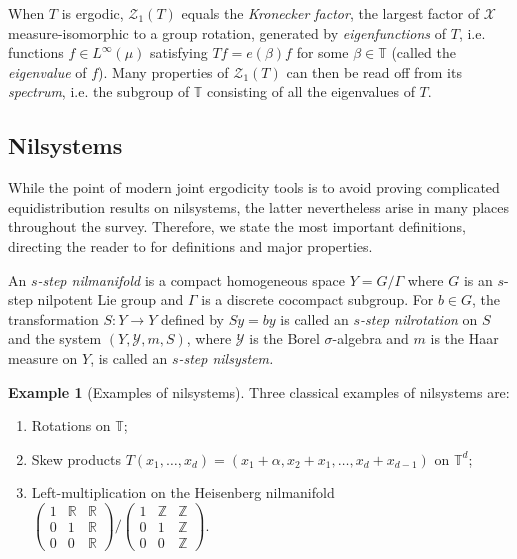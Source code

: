 \documentclass[11pt]{amsart}
\theoremstyle{definition}
\newtheorem{example}[lemma]{Example}
\newcommand{\R}{{\mathbb R}}
\newcommand{\T}{{\mathbb T}}
\newcommand{\Z}{{\mathbb Z}}
\newcommand{\CX}{{\mathcal X}}
\newcommand{\CY}{{\mathcal Y}}
\newcommand{\CZ}{{\mathcal Z}}
\newcommand{\1}{{\mathbf{1}}}
\DeclareMathOperator{\Spec}{Spec}
\newcommand{\rem}[1]{\left \{ #1 \right \}}
\begin{document}
When $T$ is ergodic, $\CZ_1(T)$ equals the \emph{Kronecker factor}, the largest factor of $\CX$ measure-isomorphic to a group rotation, generated by \emph{eigenfunctions} of $T$, i.e. functions $f\in L^\infty(\mu)$ satisfying $Tf = e(\beta) f$ for some $\beta\in\T$ (called the \emph{eigenvalue} of $f$). 
Many properties of $\CZ_1(T)$ can then be read off from its \emph{spectrum}, i.e. the subgroup of $\T$ consisting of all the eigenvalues of $T$.

\subsection{Nilsystems}\label{A: nilsystems}
While the point of modern joint ergodicity tools is to avoid proving complicated equidistribution results on nilsystems, the latter nevertheless arise in many places throughout the survey. Therefore, we state the most important definitions, directing the reader to \cite[Chapters 10 \& 11]{HK18} for definitions and major properties. 

An {\em $s$-step  nilmanifold} is a compact homogeneous space $Y=G/\Gamma$ where $G$ is an $s$-step nilpotent Lie group and $\Gamma$ is a discrete cocompact subgroup.  %
For $b\in G$, the transformation $S\colon Y\to Y$ defined by $Sy=by$ is called an {\em $s$-step  nilrotation} on $S$ and the system $(Y,\CY, m,S)$, where $\CY$ is the Borel $\sigma$-algebra and $m$ is the Haar measure on $Y$,  is called an {\em $s$-step nilsystem.}
\begin{example}[Examples of nilsystems]\label{Ex: nilsystems}
    Three classical examples of nilsystems are:
    \begin{enumerate}
        \item Rotations on $\T$;
        \item Skew products $T(x_1, \ldots, x_d) = (x_1 + \alpha, x_2 + x_1, \ldots, x_d + x_{d-1})$ on $\T^d$;
        \item Left-multiplication on the Heisenberg nilmanifold $\begin{pmatrix} 1 & \R & \R \\ 0 & 1 & \R \\ 0 & 0 & \R \end{pmatrix}/\begin{pmatrix} 1 & \Z & \Z \\ 0 & 1 & \Z \\ 0 & 0 & \Z \end{pmatrix}$.
    \end{enumerate}
\end{example}
\end{document}
